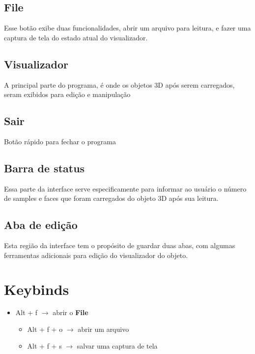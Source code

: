 \documentclass{ol-softwaremanual}
\begin{document}
\subsection{File}

Esse botão exibe duas funcionalidades, abrir um arquivo para 
leitura, e fazer uma captura de tela do estado atual do visualizador. 

\subsection{Visualizador}

A principal parte do programa, é onde os objetos 3D após 
serem carregados, seram exibidos para edição e manipulação

\subsection{Sair}

Botão rápido para fechar o programa 

\subsection{Barra de status}

Essa parte da interface serve especificamente para 
informar ao usuário o número de samples e faces que foram 
carregados do objeto 3D após sua leitura.

\subsection{Aba de edição}

Esta região da interface tem o propósito de guardar 
duas abas, com algumas ferramentas adicionais para edição 
do visualizador do objeto. 

\section{Keybinds}

\begin{itemize}
    \item Alt + f $\rightarrow$ abrir o \textbf{File} 
    \begin{itemize}
        \item Alt + f + o $\rightarrow$ abrir um arquivo 
        \item Alt + f + s $\rightarrow$ salvar uma captura de tela 
    \end{itemize}
\end{itemize}
\end{document}
